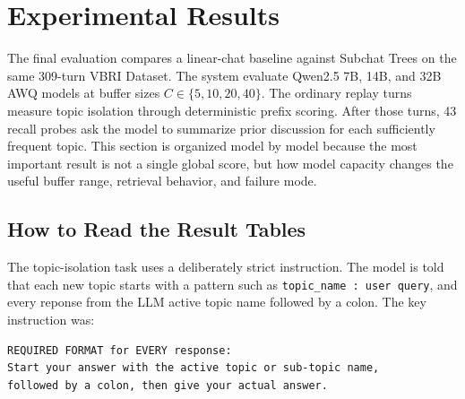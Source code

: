 \documentclass[pdflatex,sn-mathphys-num]{sn-jnl}%
\theoremstyle{thmstyleone}%
\theoremstyle{thmstyletwo}%
\theoremstyle{thmstylethree}%
\begin{document}




\section{Experimental Results}\label{sec4}

The final evaluation compares a linear-chat baseline against Subchat Trees on the same 309-turn VBRI Dataset. The system evaluate Qwen2.5 7B, 14B, and 32B AWQ models at buffer sizes $C \in \{5,10,20,40\}$. The ordinary replay turns measure topic isolation through deterministic prefix scoring. After those turns, 43 recall probes ask the model to summarize prior discussion for each sufficiently frequent topic. This section is organized model by model because the most important result is not a single global score, but how model capacity changes the useful buffer range, retrieval behavior, and failure mode.

\subsection{How to Read the Result Tables}\label{subsec:reading_results}



The topic-isolation task uses a deliberately strict instruction. The model is told that each new topic starts with a pattern such as \texttt{topic\_name : user query}, and every reponse from the LLM active topic name followed by a colon. The key instruction was:


\begin{verbatim}
REQUIRED FORMAT for EVERY response:
Start your answer with the active topic or sub-topic name,
followed by a colon, then give your actual answer.
\end{verbatim}
\end{document}
